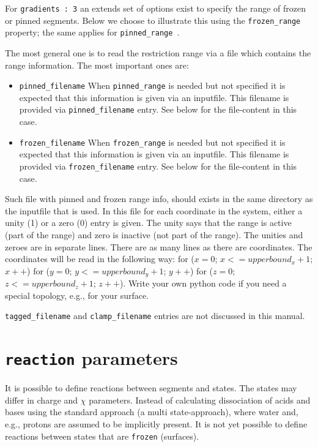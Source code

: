 \documentclass{article}
\begin{document}
For {\tt gradients : 3} an extends set of options exist to specify the range of frozen or pinned segments. Below we choose to illustrate this using the {\tt frozen\_range } property; the same applies for {\tt pinned\_range }.

The most general one is to read the restriction range via a file which contains the range information. The most important ones are: 
\begin{itemize}
\item {\tt pinned\_filename} When {\tt pinned\_range} is needed but not specified it is expected that this information is given via an inputfile. This filename is provided via {\tt pinned\_filename} entry. See below for the file-content in this case. 
\item {\tt frozen\_filename} When {\tt frozen\_range} is needed but not specified it is expected that this information is given via an inputfile. This filename is provided via {\tt frozen\_filename} entry. See below for the file-content in this case. 
\end{itemize}

\noindent Such file with pinned and frozen range info, should exists in the same directory as the inputfile that is used. In this file for each coordinate in the system, either a unity (1) or a zero (0) entry is given. The unity says that the range is active (part of the range) and zero is inactive (not part of the range). The unities and zeroes are in separate lines. There are as many lines as there are coordinates. The coordinates will be read in the following way: for ($x=0$; $x<=upperbound_x+1$; $x++$) for ($y=0$; $y<=upperbound_y+1$; $y++$) for ($z=0$; $z<=upperbound_z+1$; $z++$). Write your own python code if you need a special topology, e.g., for your surface. 

{\tt tagged\_filename} and {\tt clamp\_filename} entries are not discussed in this manual. 

\section{{\tt reaction} parameters}
\label{sec:reactions}

It is possible to define reactions between segments and states.  The  states may differ in charge and $\chi$ parameters.  Instead of calculating dissociation of acids and bases using the standard approach (a multi state-approach), where water and, e.g., protons are assumed to be implicitly present. It is not yet possible to define reactions between states that are {\tt frozen} (surfaces).
\end{document}
